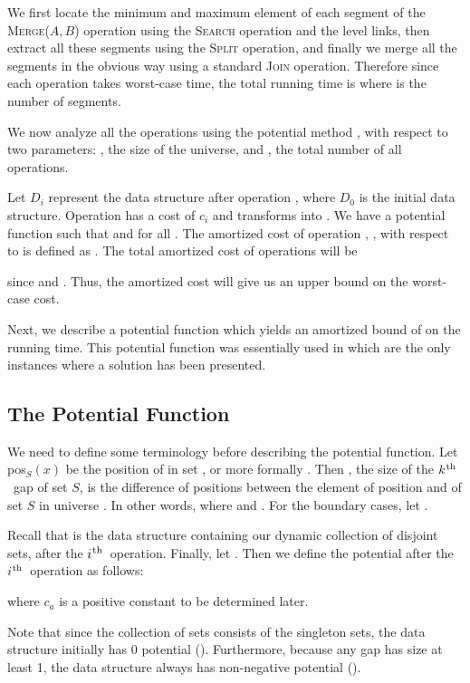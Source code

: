 \documentclass[11pt]{article}
\newcommand{\ens}[1]{\ensuremath{#1}}
\newcommand{\ith}{\ens{i^{\mbox{\hspace{.2mm}\scriptsize th}}}}
\newcommand{\kth}{\ens{k^{ \mbox{\hspace{.2mm}\scriptsize th}}}}
\newcommand{\kwMs}{Make-Set}
\newcommand{\kwSpl}{Split}
\newcommand{\kwJoinadj}{Join}
\newcommand{\kwUnion}{Merge}
\newcommand{\kwSrc}{Search}
\newcommand{\Ms}{\mbox{\textsc{\kwMs}}}
\newcommand{\Spl}{\mbox{\textsc{\kwSpl}}}
\newcommand{\Joinadj}{\mbox{\textsc{\kwJoinadj}}}
\newcommand{\Unionx}[2]{\mbox{\textsc{\kwUnion(\ensuremath{#1,#2})}}}
\newcommand{\Src}{\mbox{\textsc{\kwSrc}}}
\newcommand{\segments}{{\segment}s}
\newcommand{\segment}{segment}
\newcommand{\cons}[1]{\ensuremath{c_{#1}}}
\newcommand{\cnsa}{\cons a}
\newcommand{\node}[1]{\ensuremath{#1}}
\newcommand{\nodeposition}[2]{pos\ensuremath{_{\set #1}(\node #2)}}
\newcommand{\set}[1]{\ensuremath{#1}}
\newcommand{\datast}[1]{\ensuremath{D_{#1}}}
\newcommand{\hide}[1]{}
\newcommand{\actcost}[1]{\ensuremath{c_{#1}}}
\begin{document}
We first locate the minimum and maximum element of each \segment{} of the \Unionx{A}{B} operation using the \Src{} operation and the level links, then extract all these \segments{} using the \Spl{} operation, and finally we merge all the \segments{} in the obvious way using a standard \Joinadj{} operation. Therefore since each operation takes  worst-case time, the total running time is  where  is the number of \segments{}. 
  
We now analyze all the operations using the potential method \cite{amortizedcomplexity}, with respect to two parameters: ,\hide{the total number of \Ms{} operations} the size of the universe, and , the total number of all operations. 
  
Let \datast i represent the data structure after operation , where \datast 0 is the initial data structure. Operation  has a cost of \actcost i and transforms  into . We have a potential function  such that  and  for all . The amortized cost of operation , , with respect to  is defined as . The total amortized cost of  operations will be 
 
since  and . Thus, the amortized cost will give us an upper bound on the worst-case cost. 


Next, we describe a potential function which yields an amortized bound of  on the running time. This potential function was essentially used in \cite{DBLP:journals/talg/GeorgiadisKSTW11, journals/algorithmica/FarachT98} which are the only instances where a  solution has been presented. 


\subsection{The Potential Function} 
\label{subsec:LogSQPotFun} 
We need to define some terminology before describing the potential function. Let \nodeposition{S}{x} be the position of  in set , or more formally . Then , the size of the \kth\ gap of set \set S, is the difference of positions between the element of position  and  of set \set S in universe . In other words,  where  and  . For the boundary cases, let . 
  
Recall that  is the data structure containing our dynamic collection of disjoint sets,  after the \ith\ operation. Finally, let . Then we define the potential after the \ith\ operation as follows: 
 
where \cnsa{} is a positive constant to be determined later. 
  
Note that since the collection of sets consists of the  singleton sets, the data structure initially has 0 potential (). Furthermore, because any gap has size at least 1, the data structure always has non-negative potential (). 
\end{document}
